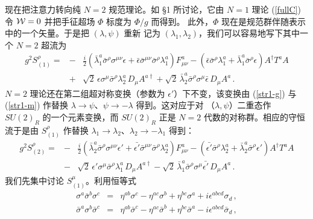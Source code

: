 现在把注意力转向纯 $N=2$ 规范理论。如 §1 所讨论，它由 $N=1$ 理论
(\ref{fullC}) 令 ${\cal W}=0$ 并把手征超场 $\Phi$ 标度为 $\Phi/g$ 而得到。
此外，$\Phi$ 现在是规范群伴随表示中的一个矢量。于是把 $(\lambda,\psi)$ 重新
记为 $(\lambda_1,\lambda_2)$，我们可以容易地写下其中一个 $N=2$ 超流为
\begin{eqnarray}
g^2 S^\rho_{(1)}=&-&\frac{i}{2}\left(\bar{\lambda}^a_1\bar{\sigma}^\rho
\sigma^{\mu\nu}\epsilon + \bar{\epsilon}\bar{\sigma}^{\mu\nu}
\bar{\sigma}^\rho \lambda^a_1\right) F^a_{\mu\nu} -
\left(\bar{\epsilon}\bar{\sigma}^\rho\lambda^a_{1}+\bar{\lambda}^a_{1}
\bar{\sigma}^\rho \epsilon\right) A^\dagger T^a A 
\nonumber \\
&+&\sqrt{2}\,\epsilon\sigma^\mu\bar{\sigma}^\rho\lambda^a_{2}\, D_\mu
A^{a\dagger}+\sqrt{2}\,\bar{\lambda}^a_{2}\bar{\sigma}^\rho \sigma^\mu
\bar{\epsilon}\, D_\mu A^a \,.\nonumber 
\end{eqnarray}
$N=2$ 理论还在第二组超对称变换（参数为 $\epsilon'$）下不变，该变换由
(\ref{str1-g}) 与 (\ref{str1-m}) 作替换
$\lambda\rightarrow\psi$、$\psi\rightarrow -\lambda$ 得到。这对应于对
（$\lambda,\psi$）二重态作 $SU(2)_R$ 的一个元素变换，而 $SU(2)_R$ 正是
$N=2$ 代数的对称群。相应的守恒流于是由 $S^\rho_{(1)}$ 作替换
$\lambda_1 \rightarrow\lambda_2$、$\lambda_2\rightarrow-\lambda_1$ 得到：
\begin{eqnarray}
g^2 S^\rho_{(2)}=&-&\frac{i}{2}\left(\bar{\lambda}^a_2\bar{\sigma}^\rho
\sigma^{\mu\nu}\epsilon' + \bar{\epsilon'}\bar{\sigma}^{\mu\nu}
\bar{\sigma}^\rho \lambda^a_2 \right) F^a_{\mu\nu} -
\left(\bar{\epsilon'}\bar{\sigma}^\rho\lambda^a_{2}+\bar{\lambda}^a_{2}
\bar{\sigma}^\rho \epsilon'\right) A^\dagger T^a A 
\nonumber \\
&-&\sqrt{2}\,\epsilon'\sigma^\mu \bar{\sigma}^\rho\lambda^a_{1}\,D_\mu
A^{a\dagger}-\sqrt{2}\,\bar{\lambda}^a_{1}\bar{\sigma}^\rho \sigma^\mu
\bar{\epsilon'}\, D_\mu A^a \,.\nonumber 
\end{eqnarray}
我们先集中讨论 $S^\mu_{(1)}$。利用恒等式
\begin{eqnarray}
\sigma^a \bar{\sigma}^b \sigma^c &=& \eta^{ab} \sigma^c - \eta^{ac}
\sigma^b + \eta^{bc} \sigma^a + i \epsilon^{abcd} \sigma_d \,, 
\nonumber\\
\bar{\sigma}^a \sigma^b \bar{\sigma}^c &=& \eta^{ab} \bar{\sigma}^c
- \eta^{ac} \bar{\sigma}^b + \eta^{bc} \bar{\sigma}^a - i
\epsilon^{abcd} \bar{\sigma}_d \nonumber\,,
\end{eqnarray}
